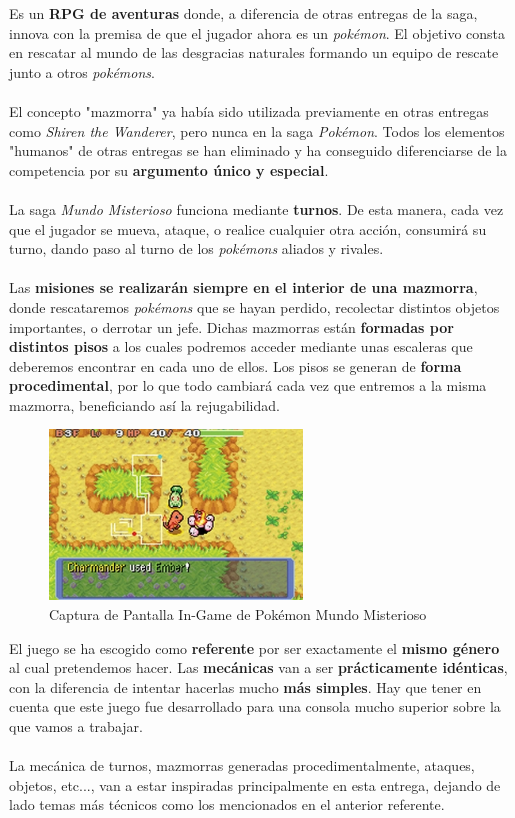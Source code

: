 Es un \textbf{RPG de aventuras} donde, a diferencia de otras entregas de la saga, innova con la premisa de que el jugador ahora es un \textit{pokémon}. El objetivo consta en rescatar al mundo de las desgracias naturales formando un equipo de rescate junto a otros \textit{pokémons}.
\\ \\
El concepto "mazmorra" ya había sido utilizada previamente en otras entregas como \textit{Shiren the Wanderer}, pero nunca en la saga \textit{Pokémon}. Todos los elementos "humanos" de otras entregas se han eliminado y ha conseguido diferenciarse de la competencia por su \textbf{argumento único y especial}.
\\ \\
La saga \textit{Mundo Misterioso} funciona mediante \textbf{turnos}. De esta manera, cada vez que el jugador se mueva, ataque, o realice cualquier otra acción, consumirá su turno, dando paso al turno de los \textit{pokémons} aliados y rivales.
\\ \\
Las \textbf{misiones se realizarán siempre en el interior de una mazmorra}, donde rescataremos \textit{pokémons} que se hayan perdido, recolectar distintos objetos importantes, o derrotar un jefe. Dichas mazmorras están \textbf{formadas por distintos pisos} a los cuales podremos acceder mediante unas escaleras que deberemos encontrar en cada uno de ellos. Los pisos se generan de \textbf{forma procedimental}, por lo que todo cambiará cada vez que entremos a la misma mazmorra, beneficiando así la rejugabilidad.

\begin{figure}[h]
\centering
\includegraphics[width=0.6\textwidth]{include/images/GameBoy/pokemon_mdr2.png}
\caption{Captura de Pantalla In-Game de Pokémon Mundo Misterioso}
\label{figure:poke_mdr2}
\end{figure}

El juego se ha escogido como \textbf{referente} por ser exactamente el \textbf{mismo género} al cual pretendemos hacer. Las \textbf{mecánicas} van a ser \textbf{prácticamente idénticas}, con la diferencia de intentar hacerlas mucho \textbf{más simples}. Hay que tener en cuenta que este juego fue desarrollado para una consola mucho superior sobre la que vamos a trabajar.
\\ \\
La mecánica de turnos, mazmorras generadas procedimentalmente, ataques, objetos, etc..., van a estar inspiradas principalmente en esta entrega, dejando de lado temas más técnicos como los mencionados en el anterior referente.
\\ \\

